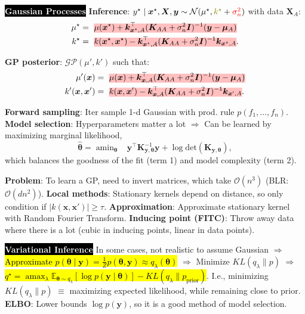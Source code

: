 \documentclass{article}
\DeclareRobustCommand{\hlal}[1]{{\textcolor{red}{#1}}}
\DeclareRobustCommand{\hlep}[1]{{\textcolor{olive}{#1}}}
\DeclareRobustCommand{\hleq}[1]{{\sethlcolor{pink} \hl{#1}}}
\DeclareMathOperator*{\argmax}{amax}
\DeclareMathOperator*{\argmin}{amin}
\newcommand{\E}{\mathbb{E}}
\newenvironment{topic}[1]
{\textbf{\sffamily  \colorbox{black}{\textcolor{white}{#1}}}}
{}
\begin{document}
\begin{multicols*}{3}
\begin{topic}{Gaussian Processes}
    \textbf{Inference}: $y^\star \mid \bm{x}^\star,\bm{X},\bm{y} \sim
    \mathcal{N}(\mu^\star,\text{\hlep{$k^\star$}} +
    \text{\hlal{$\sigma_n^2$}})$ with data $\bm{X}_A$: \begin{align*}
      \mu^\star &= \text{\hleq{$\mu(\bm{x}^\star) + \bm{k}_{\bm{x}^\star,A}^\top (\bm{K}_{AA} + \sigma_n^2 \bm{I})^{-1} (\bm{y} - \bm{\mu}_A)$}} \\
      k^\star &= \text{\hleq{$k(\bm{x}^\star,\bm{x}^\star) - \bm{k}_{\bm{x}^\star,A}^\top (\bm{K}_{AA} + \sigma_n^2\bm{I})^{-1} \bm{k}_{\bm{x}^\star,A}$}}
    .\end{align*}

    \textbf{GP posterior}: $\mathcal{GP}(\mu',k')$ such that: \begin{align*}
      \mu'(\bm{x}) &= \text{\hleq{$\mu(\bm{x}) + \bm{k}_{\bm{x},A}^\top (\bm{K}_{AA} + \sigma_n^2 \bm{I})^{-1} (\bm{y} - \bm{\mu}_A)$}} \\
      k'(\bm{x},\bm{x}') &= \text{\hleq{$k(\bm{x},\bm{x}') - \bm{k}_{\bm{x},A}^\top (\bm{K}_{AA} + \sigma_n^2\bm{I})^{-1} \bm{k}_{\bm{x}',A}$}}
    .\end{align*}

    \textbf{Forward sampling}: Iter sample 1-d Gaussian with prod. rule
    $p(f_1,\ldots,f_n)$. \textbf{Model selection}: Hyperparameters matter a lot
    $\Rightarrow$ Can be learned by maximizing marginal likelihood, \[
      \hat{\bm{\theta}} = \argmin_{\bm{\theta}} \;\;\; \bm{y}^\top
      \bm{K}_{\bm{y},\bm{\theta}}^{-1} \bm{y} + \log
      \mathrm{det}(\bm{K}_{\bm{y},\bm{\theta}}) ,\] which balances the goodness
    of the fit (term 1) and model complexity (term 2).

    \textbf{Problem}: To learn a GP, need to invert matrices, which take
    $\mathcal{O}(n^3)$ (BLR: $\mathcal{O}(dn^2)$). \textbf{Local methods}:
    Stationary kernels depend on distance, so only condition if
    $|k(\bm{x},\bm{x}')| \geq \tau$. \textbf{Approximation}: Approximate
    stationary kernel with Random Fourier Transform. \textbf{Inducing point
    (FITC)}: Throw away data where there is a lot (cubic in inducing points,
    linear in data points).
  \end{topic}

  \begin{topic}{Variational Inference}
    In some cases, not realistic to assume Gaussian $\Rightarrow$
    \hl{Approximate $p(\bm{\theta}\mid\bm{y}) =
    \frac{1}{Z}p(\bm{\theta},\bm{y}) \approx q_{\lambda}(\bm{\theta})$}
    $\Rightarrow$ Minimize $KL(q_{\lambda} \mathrel{\lVert} p)$ $\Rightarrow$
    \hleq{$q^\star = \argmax_{\lambda} \E_{\bm{\theta} \sim q_{\lambda}} [\log
    p(\bm{y}\mid \bm{\theta})] - KL(q_{\lambda} \mathrel{\lVert}
    p_{\text{prior}})$}. I.e., minimizing $KL(q_\lambda \mathrel{\lVert} p)$
    $\equiv$ maximizing expected likelihood, while remaining close to prior.
    \textbf{ELBO}: Lower bounds $\log p(\bm{y})$, so it is a good method of
    model selection.


\end{topic}
\end{multicols*}
\end{document}
